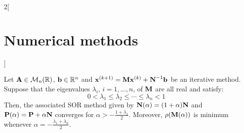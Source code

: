 \documentclass[../../../main.tex]{subfiles}
\begin{document}
\begin{multicols}{2}[\section{Numerical methods}]
\begin{definition}
    \end{definition}
    \begin{theorem}
        Let $\boldsymbol{\mathrm{A}}\in\mathcal{M}_n(\mathbb{R})$, $\boldsymbol{\mathrm{b}}\in\mathbb{R}^n$ and $\boldsymbol{\mathrm{x}}^{(k+1)}=\boldsymbol{\mathrm{M}}\boldsymbol{\mathrm{x}}^{(k)}+\boldsymbol{\mathrm{N}}^{-1}\boldsymbol{\mathrm{b}}$ be an iterative method. Suppose that the eigenvalues $\lambda_i$, $i=1,\ldots,n$, of $\boldsymbol{\mathrm{M}}$ are all real and satisfy: $$0<\lambda_1\leq\lambda_2\leq\cdots\leq\lambda_n<1$$
        Then, the associated SOR method given by $\boldsymbol{\mathrm{N}}(\alpha)=(1+\alpha)\boldsymbol{\mathrm{N}}$ and $\boldsymbol{\mathrm{P}}(\alpha)=\boldsymbol{\mathrm{P}}+\alpha\boldsymbol{\mathrm{N}}$ converges for $\alpha>-\frac{1+\lambda_1}{2}$. Moreover, $\rho(\boldsymbol{\mathrm{M}}(\alpha))$ is minimum whenever $\alpha=-\frac{\lambda_1+\lambda_n}{2}$.
    \end{theorem}

\end{multicols}
\end{document}
